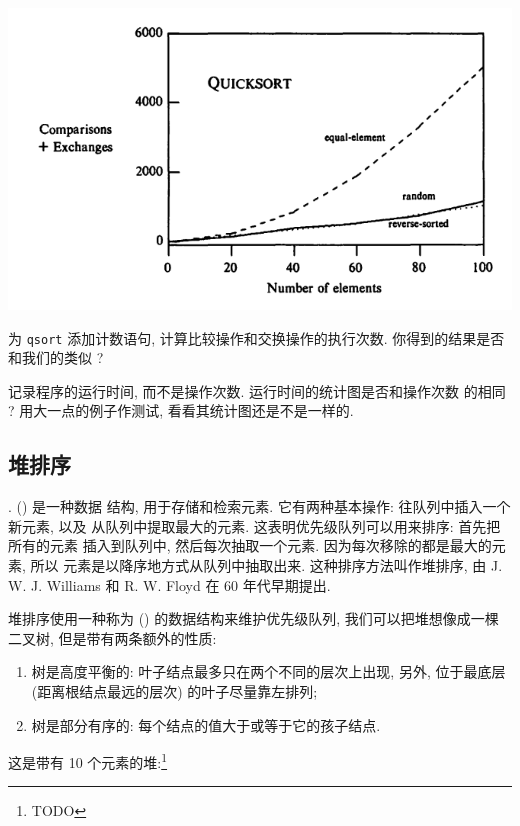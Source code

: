 \begin{center}
    \includegraphics[scale=0.7]{images/quicksort.png}
\end{center}

\begin{exercise}
    为 \texttt{qsort} 添加计数语句, 计算比较操作和交换操作的执行次数.
    你得到的结果是否和我们的类似 ?
\end{exercise}

\begin{exercise}
    记录程序的运行时间, 而不是操作次数. 运行时间的统计图是否和操作次数
    的相同 ? 用大一点的例子作测试, 看看其统计图还是不是一样的.
\end{exercise}

\subsection{堆排序}
\label{subsec:heapsort}

.  () 是一种数据
结构, 用于存储和检索元素. 它有两种基本操作: 往队列中插入一个新元素, 以及 
从队列中提取最大的元素. 这表明优先级队列可以用来排序: 首先把所有的元素
插入到队列中, 然后每次抽取一个元素. 因为每次移除的都是最大的元素, 所以 
元素是以降序地方式从队列中抽取出来. 这种排序方法叫作堆排序, 由
J. W. J. Williams 和 R. W. Floyd 在 60 年代早期提出.

堆排序使用一种称为  () 的数据结构来维护优先级队列,
我们可以把堆想像成一棵二叉树, 但是带有两条额外的性质:
\begin{enumerate}
    \item 树是高度平衡的: 叶子结点最多只在两个不同的层次上出现, 另外,
        位于最底层 (距离根结点最远的层次) 的叶子尽量靠左排列;
    \item 树是部分有序的: 每个结点的值大于或等于它的孩子结点.
\end{enumerate}
这是带有 10 个元素的堆:\footnote{TODO}

